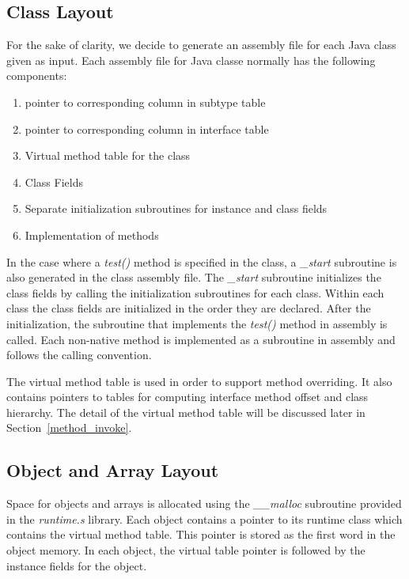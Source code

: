 \documentclass[a4paper, notitlepage]{report}
\begin{document}
\subsection{Class Layout}
\label{class_layout}
For the sake of clarity, we decide to generate an assembly file for each Java class given as input. Each assembly file for Java classe normally has the following components:
\begin{enumerate}
\item pointer to corresponding column in subtype table
\item pointer to corresponding column in interface table
\item Virtual method table for the class
\item Class Fields
\item Separate initialization subroutines for instance and class fields
\item Implementation of methods
\end{enumerate}

In the case where a \emph{test()} method is specified in the class, a \emph{\_start} subroutine is also generated in the class assembly file. The \emph{\_start} subroutine initializes the class fields by calling the initialization subroutines for each class. Within each class the class fields are initialized in the order they are declared. After the initialization, the subroutine that implements the \emph{test()} method in assembly is called. Each non-native method is implemented as a subroutine in assembly and follows the calling convention.

The virtual method table is used in order to support method overriding. It also contains pointers to tables for computing interface method offset and class hierarchy. The detail of the virtual method table will be discussed later in Section~\ref{method_invoke}. 



\subsection{Object and Array Layout}
\label{object_layout}
Space for objects and arrays is allocated using the \emph{\_\_malloc} subroutine provided in the \emph{runtime.s} library. Each object contains a pointer to its runtime class which contains the virtual method table. This pointer is stored as the first word in the object memory. In each object, the virtual table pointer is followed by the instance fields for the object.
\end{document}
